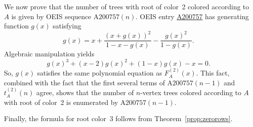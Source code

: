 \documentclass[12pt]{amsart}
\newcommand{\seqnum}[1]{\href{https://oeis.org/#1}{#1}}
\newcommand{\gff}[2]{F_{#2}^{(#1)}(x)}
\newcommand{\gfa}[1]{\gff{#1}{A}}
\begin{document}
\begin{description}
    We now prove that the number of trees with root of color~2 colored according to $A$ is given by OEIS sequence $\text{A200757}(n)$.
    OEIS entry \seqnum{A200757} has generating function $g(x)$ satisfying
    \[
    g(x) = x + \frac{(x + g(x))^2}{1-x-g(x)}-\frac{g(x)^2}{1-g(x)}.
    \]
    Algebraic manipulation yields
    \[
    g(x)^3+(x-2)g(x)^2+(1-x)g(x)-x=0.
    \]
    So, $g(x)$ satisfies the same polynomial equation as $\gfa{2}$. This fact, combined with the fact that the first several terms of $\text{A200757}(n-1)$ and $t_A^{(2)}(n)$ agree, shows that the number of $n$-vertex trees colored according to $A$ with root of color~2 is enumerated by $\text{A200757}(n-1)$.

    Finally, the formula for root color~3 follows from Theorem~\ref{prop:zerorows}.
\end{description}
\end{document}
